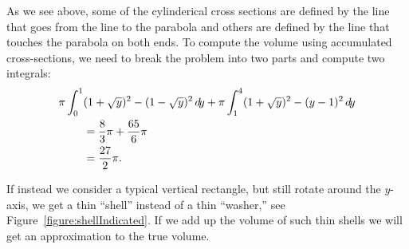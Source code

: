 \documentclass{ximera}
\begin{document}
As we see above, some of the cylinderical cross sections are defined
by the line that goes from the line to the parabola and others are
defined by the line that touches the parabola on both ends.  To
compute the volume using accumulated cross-sections, we need to break
the problem into two parts and compute two integrals:
\begin{align*}
  \pi\int_0^1 &(1+\sqrt{y})^2-(1-\sqrt{y})^2\mathop{}\!d\! y+
  \pi\int_1^4  (1+\sqrt{y})^2-(y-1)^2\mathop{}\!d\! y\\
  &={8\over3}\pi + {65\over6}\pi\\
  &={27\over2}\pi.
\end{align*}

\begin{image}
\end{image}


If instead we consider a typical vertical rectangle, but still rotate
around the $y$-axis, we get a thin ``shell'' instead of a thin
``washer,'' see Figure~\ref{figure:shellIndicated}. If we add up the
volume of such thin shells we will get an approximation to the true
volume.


\end{document}
